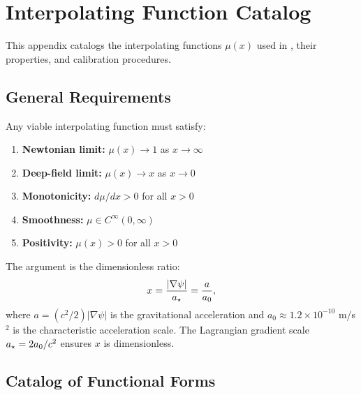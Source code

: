 
\section{Interpolating Function Catalog}\label{app:mu}

This appendix catalogs the interpolating functions $\mu(x)$ used in \DFD, 
their properties, and calibration procedures.

\subsection{General Requirements}\label{app:mu_requirements}

Any viable interpolating function must satisfy:

\begin{enumerate}
\item \textbf{Newtonian limit:} $\mu(x) \to 1$ as $x \to \infty$
\item \textbf{Deep-field limit:} $\mu(x) \to x$ as $x \to 0$
\item \textbf{Monotonicity:} $d\mu/dx > 0$ for all $x > 0$
\item \textbf{Smoothness:} $\mu \in C^\infty(0,\infty)$
\item \textbf{Positivity:} $\mu(x) > 0$ for all $x > 0$
\end{enumerate}

The argument is the dimensionless ratio:
\begin{equation}
x = \frac{|\nabla\psi|}{a_\star} = \frac{a}{a_0},
\end{equation}
where $a = (c^2/2)|\nabla\psi|$ is the gravitational acceleration and 
$a_0 \approx 1.2 \times 10^{-10}$ m/s$^2$ is the characteristic acceleration scale. 
The Lagrangian gradient scale $a_\star = 2a_0/c^2$ ensures $x$ is dimensionless.

\subsection{Catalog of Functional Forms}\label{app:mu_catalog}

